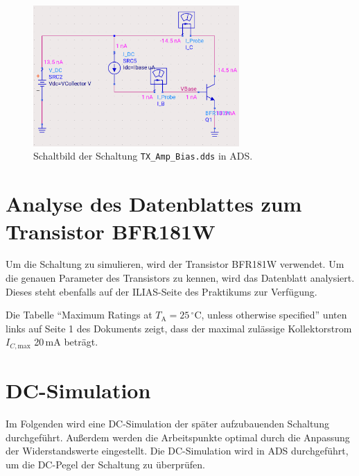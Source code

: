 \begin{figure}[h]
    \centering
    \includegraphics[width=0.7\textwidth]{Pictures/TX_BIAS.png}
    \caption{Schaltbild der Schaltung \texttt{TX\_Amp\_Bias.dds} in \ac{ADS}.}
    \label{fig:TX_BIAS}
\end{figure}

\section{Analyse des Datenblattes zum Transistor BFR181W}
Um die Schaltung zu simulieren, wird der Transistor BFR181W verwendet. Um die genauen Parameter des Transistors zu kennen, wird das Datenblatt analysiert.
Dieses steht ebenfalls auf der ILIAS-Seite des Praktikums zur Verfügung.

Die Tabelle \enquote{Maximum Ratings at $T_\mathrm{A}=25\,^\circ\mathrm{C}$, unless otherwise specified} unten links auf Seite 1 des Dokuments zeigt, dass der maximal zulässige Kollektorstrom $I_{C,\mathrm{max}}$ 20\,mA beträgt.

\section{DC-Simulation}
Im Folgenden wird eine DC-Simulation der später aufzubauenden Schaltung durchgeführt. 
Außerdem werden die Arbeitspunkte optimal durch die Anpassung der Widerstandswerte eingestellt.
Die DC-Simulation wird in \ac{ADS} durchgeführt, um die DC-Pegel der Schaltung zu überprüfen.


